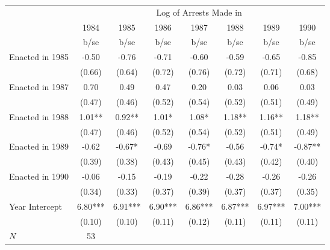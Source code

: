 {
\def\sym#1{\ifmmode^{#1}\else\(^{#1}\)\fi}
\begin{tabular}{l*{7}{c}}
\hline\hline
            &\multicolumn{7}{c}{Log of Arrests Made in}                                                                     \\
            &        1984   &        1985   &        1986   &        1987   &        1988   &        1989   &        1990   \\
            &        b/se   &        b/se   &        b/se   &        b/se   &        b/se   &        b/se   &        b/se   \\
\hline
Enacted in 1985&       -0.50   &       -0.76   &       -0.71   &       -0.60   &       -0.59   &       -0.65   &       -0.85   \\
            &      (0.66)   &      (0.64)   &      (0.72)   &      (0.76)   &      (0.72)   &      (0.71)   &      (0.68)   \\
Enacted in 1987&        0.70   &        0.49   &        0.47   &        0.20   &        0.03   &        0.06   &        0.03   \\
            &      (0.47)   &      (0.46)   &      (0.52)   &      (0.54)   &      (0.52)   &      (0.51)   &      (0.49)   \\
Enacted in 1988&        1.01** &        0.92** &        1.01*  &        1.08*  &        1.18** &        1.16** &        1.18** \\
            &      (0.47)   &      (0.46)   &      (0.52)   &      (0.54)   &      (0.52)   &      (0.51)   &      (0.49)   \\
Enacted in 1989&       -0.62   &       -0.67*  &       -0.69   &       -0.76*  &       -0.56   &       -0.74*  &       -0.87** \\
            &      (0.39)   &      (0.38)   &      (0.43)   &      (0.45)   &      (0.43)   &      (0.42)   &      (0.40)   \\
Enacted in 1990&       -0.06   &       -0.15   &       -0.19   &       -0.22   &       -0.28   &       -0.26   &       -0.26   \\
            &      (0.34)   &      (0.33)   &      (0.37)   &      (0.39)   &      (0.37)   &      (0.37)   &      (0.35)   \\
Year Intercept&        6.80***&        6.91***&        6.90***&        6.86***&        6.87***&        6.97***&        7.00***\\
            &      (0.10)   &      (0.10)   &      (0.11)   &      (0.12)   &      (0.11)   &      (0.11)   &      (0.11)   \\
\hline
\(N\)       &          53   &               &               &               &               &               &               \\
\hline\hline
\end{tabular}
}
